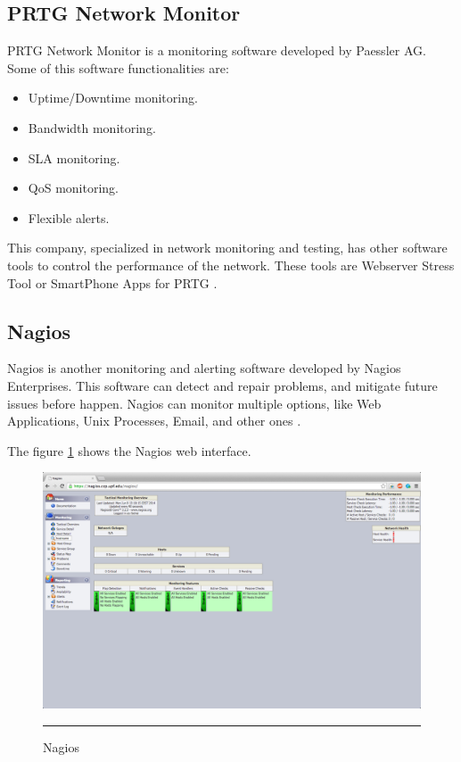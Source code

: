 \documentclass[12pt, a4paper,twoside]{tesi_upf}
\begin{document}
\subsection{PRTG Network Monitor}
PRTG Network Monitor is a monitoring software developed by Paessler AG. 
Some of this software functionalities are:
\begin{itemize}
\item Uptime/Downtime monitoring.
\item Bandwidth monitoring.
\item SLA monitoring.
\item QoS monitoring.
\item Flexible alerts.
\end{itemize}

This company, specialized in network monitoring and testing, has other software tools to control the performance of the network. These tools are Webserver Stress Tool or SmartPhone Apps for PRTG \cite{prtg}.

\subsection{Nagios}
Nagios is another monitoring and alerting software developed by Nagios Enterprises. This software can detect and repair problems, and mitigate future issues before happen. Nagios can monitor multiple options, like Web Applications, Unix Processes, Email, and other ones \cite{nagios}.

The figure \ref{fig:nagios} shows the Nagios web interface.

      \begin{figure}[H]
          \centering
              \includegraphics[scale=0.27]{./figures/Nagios.png}
              \rule{32em}{0.5pt}
          \caption[Nagios]{Nagios}
          \label{fig:nagios}
        \end{figure}
\end{document}
